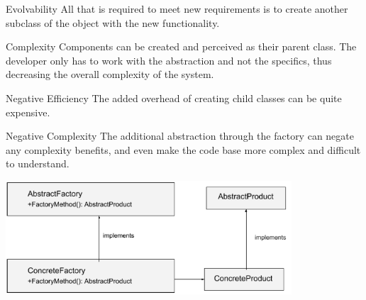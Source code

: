 \begin{nfps}
\item[Evolvability] All that is required to meet new requirements is to create
    another subclass of the object with the new functionality.
\item[Complexity] Components can be created and perceived as their parent
    class. The developer only has to work with the abstraction and not the
    specifics, thus decreasing the overall complexity of the system.
\item[Negative Efficiency] The added overhead of creating child
    classes can be quite expensive.
\item[Negative Complexity] The additional abstraction through the factory can
    negate any complexity benefits, and even make the code base more complex
    and difficult to understand.
\end{nfps}

\begin{center}
    \includegraphics[width=0.8\textwidth]{./factory}
\end{center}
